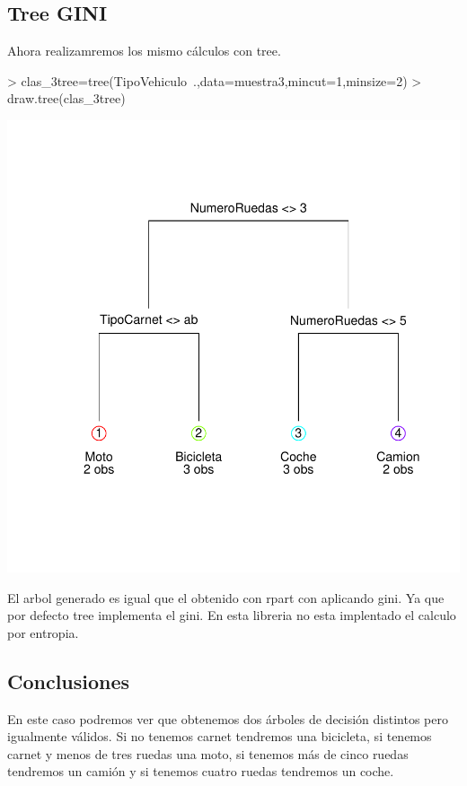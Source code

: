 \documentclass [a4paper] {article}
\begin{document}
\subsection{Tree GINI}
Ahora realizamremos los mismo cálculos con tree.
\begin{center}
\begin{Schunk}
\begin{Sinput}
> clas_3tree=tree(TipoVehiculo~.,data=muestra3,mincut=1,minsize=2) 
> draw.tree(clas_3tree)
\end{Sinput}
\end{Schunk}
\includegraphics{entrega-tree3}
\end{center}

El arbol generado es igual que el obtenido con rpart con aplicando gini.
Ya que por defecto tree implementa el gini.
En esta libreria no esta implentado el calculo por entropia.

\subsection{Conclusiones}
En este caso podremos ver que obtenemos dos árboles de decisión distintos pero igualmente válidos.
Si no tenemos carnet tendremos una bicicleta,
si tenemos carnet y menos de tres ruedas una moto,
si tenemos más de cinco ruedas tendremos un camión y
si tenemos cuatro ruedas tendremos un coche.
\end{document}
